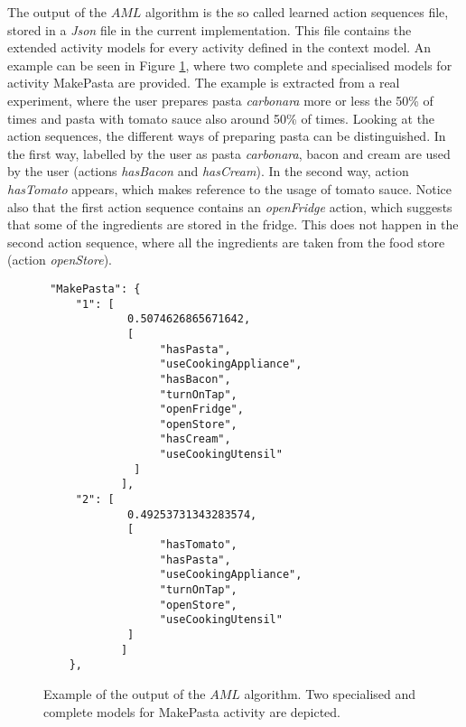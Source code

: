 The output of the $AML$ algorithm is the so called learned action sequences file, stored in a \textit{Json} file in the current implementation. This file contains the extended activity models for every activity defined in the context model. An example can be seen in Figure \ref{fig-aml-output}, where two complete and specialised models for activity MakePasta are provided. The example is extracted from a real experiment, where the user prepares pasta \textit{carbonara} more or less the 50\% of times and pasta with tomato sauce also around 50\% of times. Looking at the action sequences, the different ways of preparing pasta can be distinguished. In the first way, labelled by the user as pasta \textit{carbonara}, bacon and cream are used by the user (actions \textit{hasBacon} and \textit{hasCream}). In the second way, action \textit{hasTomato} appears, which makes reference to the usage of tomato sauce. Notice also that the first action sequence contains an \textit{openFridge} action, which suggests that some of the ingredients are stored in the fridge. This does not happen in the second action sequence, where all the ingredients are taken from the food store (action \textit{openStore}).

\begin{figure}[htbp]
\begin{small}
\begin{lstlisting}
 "MakePasta": {
     "1": [          
             0.5074626865671642, 
             [
                  "hasPasta", 
                  "useCookingAppliance", 
                  "hasBacon", 
                  "turnOnTap", 
                  "openFridge", 
                  "openStore", 
                  "hasCream", 
                  "useCookingUtensil"
              ]
            ],
     "2": [
             0.49253731343283574, 
             [
                  "hasTomato", 
                  "hasPasta", 
                  "useCookingAppliance", 
                  "turnOnTap", 
                  "openStore", 
                  "useCookingUtensil"
             ]
            ]        
    }, 

\end{lstlisting}
\end{small}
\caption{Example of the output of the $AML$ algorithm. Two specialised and complete models for MakePasta activity are depicted.}
\label{fig-aml-output}
\end{figure}


